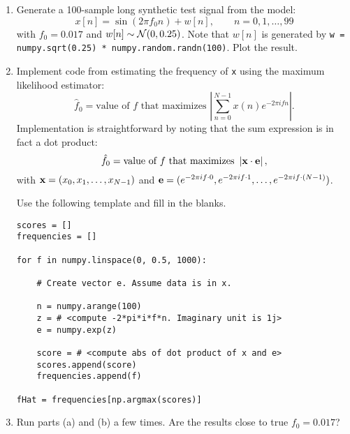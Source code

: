 \documentclass[a4paper,12pt]{scrartcl}
\newcommand{\x}{{\bf x}}
\begin{document}
\begin{enumerate}
\begin{enumerate}
\item Generate a 100-sample long synthetic test signal from the model:
\[
x[n] = \sin\left( 2\pi f_0 n \right) + w[n], \qquad n = 0,1,\ldots, 99
\]
with $f_0 = 0.017$ and $w[n]\sim {\cal N}(0,0.25)$. Note that $w[n]$ is generated
by \verb+w = numpy.sqrt(0.25) * numpy.random.randn(100)+. Plot the result.
\item Implement code from estimating the frequency of \verb+x+ using the maximum likelihood 
estimator:
\[
\hat{f}_0 = \text{value of } f \text{ that maximizes } \left|\sum_{n=0}^{N-1} x(n)e^{-2\pi i f n}\right|.
\]
Implementation is straightforward by noting that the sum expression is in fact a dot product:
\[
\hat{f}_0 = \text{value of } f \text{ that maximizes } \left|\x \cdot {\bf e}\right|,
\]
with $\x=(x_0,x_1,\ldots, x_{N-1})$ and ${\bf e}=(e^{-2\pi i f \cdot 0}, e^{-2\pi i f \cdot 1},\ldots , e^{-2\pi i f \cdot (N-1)})$.

Use the following template and fill in the blanks.
\begin{lstlisting}
scores = []
frequencies = []

for f in numpy.linspace(0, 0.5, 1000):
    
    # Create vector e. Assume data is in x.
    
    n = numpy.arange(100)
    z = # <compute -2*pi*i*f*n. Imaginary unit is 1j>
    e = numpy.exp(z)
		
    score = # <compute abs of dot product of x and e>
    scores.append(score)
    frequencies.append(f)

fHat = frequencies[np.argmax(scores)]
\end{lstlisting}
\item Run parts (a) and (b) a few times. Are the results close to true $f_0 = 0.017$?
\end{enumerate}

\end{enumerate}
\end{document}
